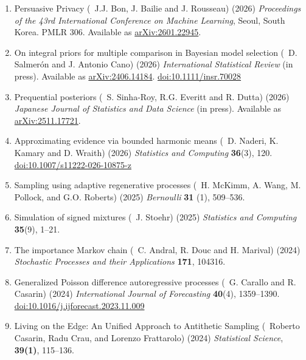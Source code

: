 \medskip
\begin{enumerate}
\renewcommand{\theenumi}{[P-\arabic{enumi}]}

\item Persuasive Privacy (\avec~J.J. Bon, J. Bailie and J. Rousseau) (2026)
{\em Proceedings of the 43rd International Conference on Machine Learning},
Seoul, South Korea. PMLR 306.
Available as \href{https://arxiv.org/abs/2601.22945}{arXiv:2601.22945}.

\item On integral priors for multiple comparison in Bayesian model selection
(\avec~D. Salmerón and J. Antonio Cano) (2026)
{\em International Statistical Review} (in press).
Available as \href{https://arxiv.org/abs/2406.14184}{arXiv:2406.14184}.
\href{https://doi.org/10.1111/insr.70028}{doi:10.1111/insr.70028}

\item Prequential posteriors (\avec~S. Sinha-Roy, R.G. Everitt and R. Dutta) (2026)
{\em Japanese Journal of Statistics and Data Science} (in press).
Available as \href{https://arxiv.org/abs/2511.17721}{arXiv:2511.17721}.

\item Approximating evidence via bounded harmonic means
(\avec~D. Naderi, K. Kamary and D. Wraith) (2026)
{\em Statistics and Computing} {\bf 36}(3), 120.
\href{https://doi.org/10.1007/s11222-026-10875-z}{doi:10.1007/s11222-026-10875-z}

\item Sampling using adaptive regenerative processes 
(\avec~H. McKimm, A. Wang, M. Pollock, and G.O. Roberts) (2025)
{\em Bernoulli} {\bf 31} (1), 509--536.

\item Simulation of signed mixtures (\avec~J. Stoehr) (2025)
{\em Statistics and Computing} {\bf 35}(9), 1--21. 

\item The importance Markov chain (\avec~C. Andral, R. Douc and H. Marival) (2024)
{\em Stochastic Processes and their Applications} {\bf 171}, 104316.

\item Generalized Poisson difference autoregressive processes
(\avec~G. Carallo and R. Casarin) (2024)
{\em International Journal of Forecasting} {\bf 40}(4), 1359--1390.
\href{https://doi.org/10.1016/j.ijforecast.2023.11.009}{doi:10.1016/j.ijforecast.2023.11.009}

\item Living on the Edge: An Unified Approach to Antithetic Sampling (\avec~Roberto Casarin, Radu Crau, and Lorenzo Frattarolo) (2024)
{\em Statistical Science}, {\bf 39(1)}, 115--136.


\end{enumerate}
